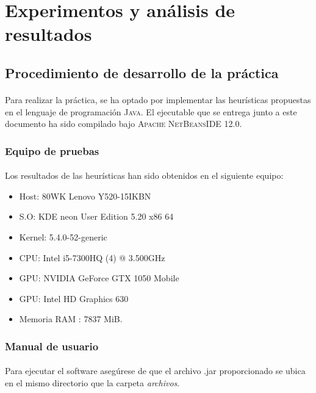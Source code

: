 \section{Experimentos y análisis de resultados}
	
	\subsection{Procedimiento de desarrollo de la práctica}
	
	\paragraph{}Para realizar la práctica, se ha optado por implementar las heurísticas propuestas en el lenguaje de programación \textsc{Java}. El ejecutable que se entrega junto a este documento ha sido compilado bajo \textsc{ Apache NetBeansIDE 12.0}.
	
	\subsubsection{Equipo de pruebas}
	
	\paragraph{}Los resultados de las heurísticas han sido obtenidos en el siguiente equipo:
	
		\begin{itemize}
			
			\item Host: 80WK Lenovo Y520-15IKBN
			\item S.O: KDE neon User Edition 5.20 x86 64
			\item Kernel: 5.4.0-52-generic
			\item CPU: Intel i5-7300HQ (4) @ 3.500GHz
			\item GPU: NVIDIA GeForce GTX 1050 Mobile
			\item GPU: Intel HD Graphics 630
			\item Memoria RAM : 7837 MiB.
			
		\end{itemize}

	\subsubsection{Manual de usuario}
	
		\paragraph{}Para ejecutar el software asegúrese de que el archivo .jar proporcionado se ubica en el mismo directorio que la carpeta \emph{archivos}. 
		
